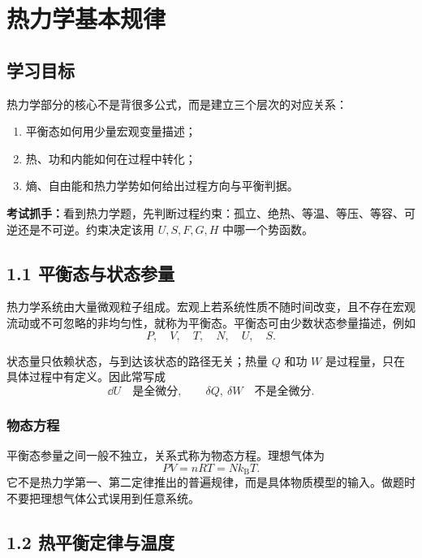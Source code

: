 \chapter{热力学基本规律}

\section{学习目标}

热力学部分的核心不是背很多公式，而是建立三个层次的对应关系：
\begin{enumerate}
  \item 平衡态如何用少量宏观变量描述；
  \item 热、功和内能如何在过程中转化；
  \item 熵、自由能和热力学势如何给出过程方向与平衡判据。
\end{enumerate}

\begin{keybox}
\textbf{考试抓手：}看到热力学题，先判断过程约束：孤立、绝热、等温、等压、等容、可逆还是不可逆。约束决定该用 $U,S,F,G,H$ 中哪一个势函数。
\end{keybox}

\section{1.1 平衡态与状态参量}

热力学系统由大量微观粒子组成。宏观上若系统性质不随时间改变，且不存在宏观流动或不可忽略的非均匀性，就称为平衡态。平衡态可由少数状态参量描述，例如
\[
  P,\quad V,\quad T,\quad N,\quad U,\quad S .
\]

状态量只依赖状态，与到达该状态的路径无关；热量 $Q$ 和功 $W$ 是过程量，只在具体过程中有定义。因此常写成
\[
  \dd U \quad \text{是全微分}, \qquad \delta Q,\ \delta W \quad \text{不是全微分}.
\]

\subsection*{物态方程}

平衡态参量之间一般不独立，关系式称为物态方程。理想气体为
\[
  PV = nRT = Nk_{\mathrm B}T .
\]
它不是热力学第一、第二定律推出的普遍规律，而是具体物质模型的输入。做题时不要把理想气体公式误用到任意系统。

\section{1.2 热平衡定律与温度}

